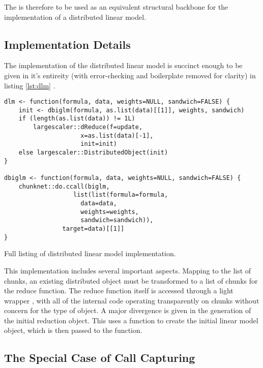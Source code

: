 The  is therefore to be used as an equivalent structural backbone for the implementation of a distributed linear model.

\subsection{Implementation Details}

The implementation of the distributed linear model is succinct enough to be given in it's entireity (with error-checking and boilerplate removed for clarity) in listing \cref{lst:dlm} .

\begin{listing}
	\begin{verbatim}
dlm <- function(formula, data, weights=NULL, sandwich=FALSE) {
	init <- dbiglm(formula, as.list(data)[[1]], weights, sandwich)
	if (length(as.list(data)) != 1L)
		largescaler::dReduce(f=update,
				     x=as.list(data)[-1],
				     init=init)
	else largescaler::DistributedObject(init)
}

dbiglm <- function(formula, data, weights=NULL, sandwich=FALSE) {
	chunknet::do.ccall(biglm,
		           list(list(formula=formula,
				     data=data,
				     weights=weights,
				     sandwich=sandwich)),
			    target=data)[[1]]
}
\end{verbatim}
\caption{Full listing of distributed linear model implementation.}
\label{lst:dlm}
\end{listing}

This implementation includes several important aspects.
Mapping to the list of chunks, an existing distributed object must be transformed to a list of chunks for the reduce function.
The reduce function itself is accessed through a light wrapper , with all of the internal code operating transparently on chunks without concern for the type of object.
A major divergence is given in the generation of the initial reduction object.
This uses a  function to create the initial  linear model object, which is then passed to the  function.

\subsection{The Special Case of Call Capturing}

